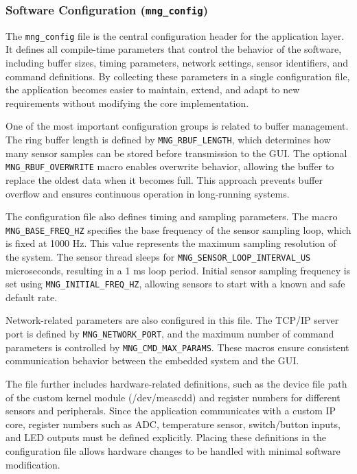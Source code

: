 \subsubsection{Software Configuration (\texttt{mng\_config})}

The \texttt{mng\_config} file is the central configuration header for the application layer.
 It defines all compile-time parameters that control the behavior of the software, 
 including buffer sizes, timing parameters, network settings, sensor identifiers, 
 and command definitions. By collecting these parameters in a single configuration 
 file, the application becomes easier to maintain, extend, and adapt to new 
 requirements without modifying the core implementation.

One of the most important configuration groups is related to buffer management. 
The ring buffer length is defined by \texttt{MNG\_RBUF\_LENGTH}, which determines how many 
sensor samples can be stored before transmission to the GUI. The optional 
\texttt{MNG\_RBUF\_OVERWRITE} macro enables overwrite behavior, allowing the buffer to replace 
the oldest data when it becomes full. This approach prevents buffer overflow and 
ensures continuous operation in long-running systems.

The configuration file also defines timing and sampling parameters. The macro 
\texttt{MNG\_BASE\_FREQ\_HZ} specifies the base frequency of the sensor sampling loop, which 
is fixed at 1000 Hz. This value represents the maximum sampling resolution of the 
system. The sensor thread sleeps for \texttt{MNG\_SENSOR\_LOOP\_INTERVAL\_US} 
microseconds, resulting in a 1 ms loop period. Initial sensor sampling frequency 
is set using \texttt{MNG\_INITIAL\_FREQ\_HZ}, allowing sensors to start with a known and safe 
default rate.

Network-related parameters are also configured in this file. The TCP/IP server 
port is defined by \texttt{MNG\_NETWORK\_PORT}, and the maximum number of command parameters 
is controlled by \texttt{MNG\_CMD\_MAX\_PARAMS}. These macros ensure consistent communication 
behavior between the embedded system and the GUI.

The file further includes hardware-related definitions, such as the device file 
path of the custom kernel module (/dev/meascdd) and register numbers for different 
sensors and peripherals. Since the application communicates with a custom IP core, 
register numbers such as ADC, temperature sensor, switch/button inputs, and LED 
outputs must be defined explicitly. Placing these definitions in the configuration 
file allows hardware changes to be handled with minimal software modification.

